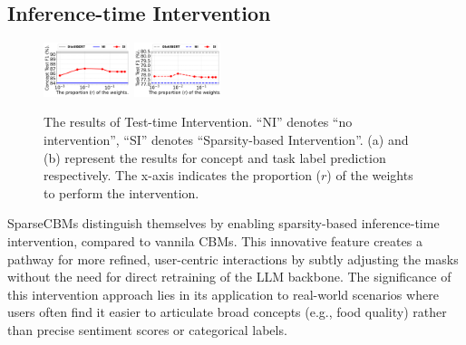 \documentclass[letterpaper]{article} %
\begin{document}
\subsection{Inference-time Intervention}
\begin{figure}[b]
		\centering
\captionsetup[sub]{skip=-0.5pt}
{\includegraphics[width=0.225\textwidth]{img/intervene-cebab-concept.pdf}}
{\includegraphics[width=0.225\textwidth]{img/intervene-cebab-task.pdf}}
		\caption{The results of Test-time Intervention. ``NI'' denotes ``no intervention'', ``SI'' denotes ``Sparsity-based Intervention''. (a) and (b) represent the results for concept and task label prediction respectively. The x-axis indicates the proportion ($r$) of the weights to perform the intervention.}
		\label{fig:intervene}
	\end{figure}
SparseCBMs distinguish themselves by enabling sparsity-based inference-time intervention, compared to vannila CBMs. This innovative feature creates a pathway for more refined, user-centric interactions by subtly adjusting the masks without the need for direct retraining of the LLM backbone. The significance of this intervention approach lies in its application to real-world scenarios where users often find it easier to articulate broad concepts (e.g., food quality) rather than precise sentiment scores or categorical labels.
\end{document}
